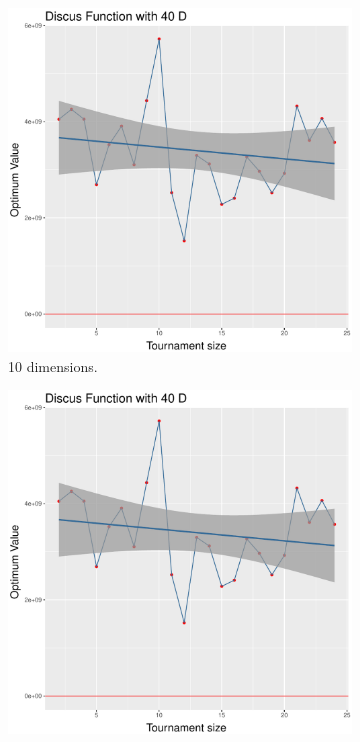 \begin{figure}[t]
	\begin{subfigure}[b]{0.33\textwidth}
		\centering
		\includegraphics[width=\textwidth]{img/unimodal_2n2n_11_dim_40.pdf}
		\caption{10 dimensions.}
	\end{subfigure}
	\begin{subfigure}[b]{0.33\textwidth}
		\centering
		\includegraphics[width=\textwidth]{img/unimodal_2n2n_11_dim_40.pdf}

\end{subfigure}
\end{figure}
